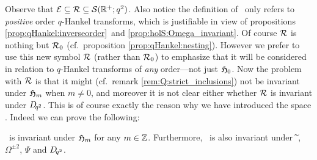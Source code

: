 Observe that $\mathcal E  \subseteq \mathcal R \subseteq {\mathcal S}(\mathbb{R}^+;q^2)$.
Also notice the definition of \Hcore\ only refers to {\em positive\/}
order $q$-Hankel transforms, which is justifiable in view of
propositions \ref{prop:qHankel:inverseorder}\ and \ref{prop:holS:Omega_invariant}\@.
Of course $\mathcal R$ is nothing but ${\mathcal R}_{0}$ (cf.\ proposition \ref{prop:qHankel:nesting}).
However we prefer to use this new symbol $\mathcal R$ (rather than ${\mathcal R}_{0}$)
to emphasize that it will be considered in relation to $q$-Hankel transforms
of {\em any\/} order---not just $\mathfrak{H}_{0}$.
Now the problem with $\mathcal R$ is that it might
(cf.\ remark \ref{rem:Q:strict_inclusions})
not be invariant under $\mathfrak{H}_{m}$ when $m \neq 0$, and moreover it
is not clear either whether $\mathcal R$ is invariant under $D_{\!q^2}$.
This is of course exactly the reason why we have introduced the space \Hcore\@.
Indeed we can prove the following:



\begin{prop} \label{prop:Hcore:invariance}
\hspace{2pt} \Hcore\ is invariant under\/ $\mathfrak{H}_{m}$ for any\/ $m\in \mathbb{Z}$.
Furthermore, \Hcore\ is also invariant under\/ $\widetilde{\:}$, $\Omega^{\pm 2}$,
$\Psi$ and\/ $D_{\!q^2}$.
\end{prop}

